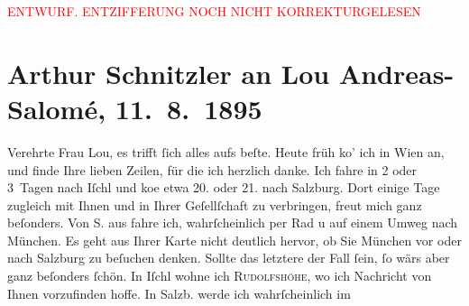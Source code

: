 
\begin{center}
            \textcolor{red}{ENTWURF. ENTZIFFERUNG NOCH NICHT KORREKTURGELESEN}
                      \end{center}
            
               \section[Arthur Schnitzler an Lou Andreas-Salomé, 11. 8. 1895]{ Arthur Schnitzler an Lou Andreas-Salomé,
                    11. 8. 1895}\nopagebreak{}\rehead{ }\begin{ledgroupsized}[t]{13cm}\normalsize\beginnumbering{} \toendnotes[C]{\smallbreak\pagebreak[2]} 
\pstart{}{\pb}Verehrte Frau Lou,\pend\pstart
           es trifft ſich alles aufs beſte. Heute früh ko{\geminationm}’ ich
                    in Wien an, und  finde Ihre lieben Zeilen, für die ich herzlich danke.\pend
           \pstart
           Ich fahre in 2 oder 3 Tagen nach Iſchl
                    und ko{\geminationm}e etwa 20. oder
                        21. nach Salzburg. Dort
                    einige Tage zugleich mit Ihnen und in Ihrer Geſellſchaft zu verbringen, freut
                        {\pb}mich ganz beſonders. Von S. aus fahre ich, wahrſcheinlich per Rad u auf einem
                    Umweg nach München. Es geht aus Ihrer
                    Karte nicht deutlich hervor, ob Sie München vor oder nach Salzburg zu beſuchen denken. Sollte das letztere der Fall ſein,
                    ſo wärs aber ganz beſonders ſchön.\pend
           \pstart
           In Iſchl wohne ich \textsc{Rudolfshöhe}, {\pb}wo ich Nachricht von Ihnen vorzufinden hoffe. In
                        Salzb. werde ich wahrſcheinlich im

\end{ledgroupsized}
